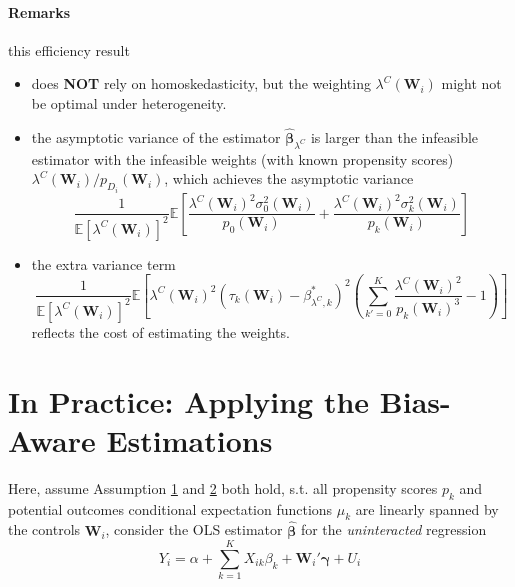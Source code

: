 \documentclass[twoside]{article}
\begin{document}
\paragraph*{Remarks} this efficiency result 
\begin{itemize}
    \item does \textbf{NOT} rely on homoskedasticity, but the weighting $\lambda^C(\mathbf{W}_i)$ might not be optimal under heterogeneity.
    \item the asymptotic variance of the estimator $\hat{\boldsymbol{\beta}}_{\lambda^C}$ is larger than the infeasible estimator with the infeasible weights (with known propensity scores) $\lambda^C(\mathbf{W}_i)/p_{D_i}(\mathbf{W}_i)$, which achieves the asymptotic variance 
    \begin{equation*}
        \frac{1}{\mathbb{E}\left[\lambda^C(\mathbf{W}_i)\right]^2} \mathbb{E}\left[ \frac{\lambda^C(\mathbf{W}_i)^2\sigma^2_0(\mathbf{W}_i)}{p_0(\mathbf{W}_i)} + \frac{\lambda^C(\mathbf{W}_i)^2\sigma^2_k(\mathbf{W}_i)}{p_k(\mathbf{W}_i)}  \right]
    \end{equation*}
    \item the extra variance term 
    $$
    \frac{1}{\mathbb{E}\left[\lambda^C(\mathbf{W}_i)\right]^2} \mathbb{E}\left[  \lambda^C(\mathbf{W}_i)^2\left(\tau_k(\mathbf{W}_i)-\beta^*_{\lambda^C,k}\right)^2 \left( \sum^K_{k'=0}\frac{\lambda^C(\mathbf{W}_i)^2}{p_k(\mathbf{W}_i)^3} -1 \right) \right]
    $$
    reflects the cost of estimating the weights.
\end{itemize}

\section{In Practice: Applying the Bias-Aware Estimations}
Here, assume Assumption \hyperref[assumption1]{1} and \hyperref[assumption2]{2} both hold, s.t. all propensity scores $p_k$ and potential outcomes conditional expectation functions $\mu_k$ are linearly spanned by the controls $\mathbf{W}_i$, consider the OLS estimator $\hat{\boldsymbol{\beta}}$ for the \textit{uninteracted} regression 
\begin{equation}
    Y_i = \alpha + \sum^K_{k=1}X_{ik}\beta_k  +\mathbf{W}_i'\boldsymbol{\gamma} + U_i
\end{equation}
\end{document}
